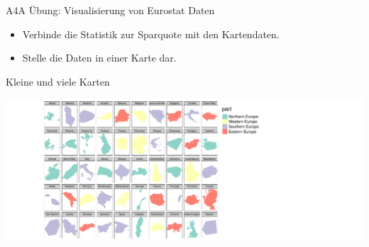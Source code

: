 \documentclass[ignorenonframetext,]{beamer}
\newenvironment{Shaded}{\begin{snugshade}}{\end{snugshade}}
\newcommand{\DataTypeTok}[1]{\textcolor[rgb]{0.13,0.29,0.53}{#1}}
\newcommand{\DecValTok}[1]{\textcolor[rgb]{0.00,0.00,0.81}{#1}}
\newcommand{\KeywordTok}[1]{\textcolor[rgb]{0.13,0.29,0.53}{\textbf{#1}}}
\newcommand{\NormalTok}[1]{#1}
\newcommand{\OperatorTok}[1]{\textcolor[rgb]{0.81,0.36,0.00}{\textbf{#1}}}
\newcommand{\OtherTok}[1]{\textcolor[rgb]{0.56,0.35,0.01}{#1}}
\newcommand{\StringTok}[1]{\textcolor[rgb]{0.31,0.60,0.02}{#1}}
\providecommand{\tightlist}{%
  \setlength{\itemsep}{0pt}\setlength{\parskip}{0pt}}
\begin{document}
\begin{frame}{A4A Übung: Visualisierung von Eurostat Daten}
\protect\hypertarget{a4a-ubung-visualisierung-von-eurostat-daten}{}

\begin{itemize}
\tightlist
\item
  Verbinde die Statistik zur Sparquote mit den Kartendaten.
\item
  Stelle die Daten in einer Karte dar.
\end{itemize}

\end{frame}

\begin{frame}[fragile]{Kleine und viele Karten}
\protect\hypertarget{kleine-und-viele-karten}{}

\begin{Shaded}
\end{Shaded}

\includegraphics{A4_tmap_files/figure-beamer/unnamed-chunk-51-1.pdf}

\end{frame}
\end{document}
